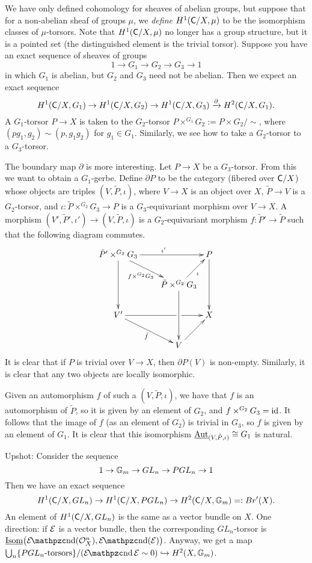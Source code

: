 \begin{remark}
 We have only defined cohomology for sheaves of abelian groups, but suppose that for a non-abelian sheaf of groups $\mu$, we \emph{define} $H^1(\text{\sf C}/X,\mu)$ to be the isomorphism classes of $\mu$-torsors. Note that $H^1(\text{\sf C}/X,\mu)$ no longer has a group structure, but it is a pointed set (the distinguished element is the trivial torsor). Suppose you have an exact sequence of sheaves of groups
 \[
  1\to G_1\to G_2\to G_3\to 1
 \]
 in which $G_1$ is abelian, but $G_2$ and $G_3$ need not be abelian. Then we expect an exact sequence
 \[
  H^1(\text{\sf C}/X,G_1)\to H^1(\text{\sf C}/X,G_2)\to H^1(\text{\sf C}/X,G_3)\xrightarrow\partial H^2(\text{\sf C}/X,G_1).
 \]
 A $G_1$-torsor $P\to X$ is taken to the $G_2$-torsor $P\times^{G_1}G_2:=P\times G_2/\sim$, where $(pg_1,g_2)\sim(p,g_1g_2)$ for $g_1\in G_1$. Similarly, we see how to take a $G_2$-torsor to a $G_3$-torsor.

 The boundary map $\partial$ is more interesting. Let $P\to X$ be a $G_3$-torsor. From this we want to obtain a $G_1$-gerbe. Define $\partial P$ to be the category (fibered over $\text{\sf C}/X$) whose objects are triples $(V,\tilde P,\iota)$, where $V\to X$ is an object over $X$, $\tilde P\to V$ is a $G_2$-torsor, and $\iota: \tilde P\times^{G_2}G_3\to P$ is a $G_3$-equivariant morphism over $V\to X$. A morphism $(V',\tilde P',\iota')\to (V,\tilde P,\iota)$ is a $G_2$-equivariant morphism $f:\tilde P' \to \tilde P$ such that the following diagram commutes.
 \[\xymatrix@!0 @R+1pc @C+1pc{
  \tilde P'\times^{G_2}G_3\ar[dd] \ar[drr]_{f\times^{G_2}G_3}\ar[rrr]^{\iota'} & & & P\ar[dd]\\
  & & \tilde P\times^{G_2}G_3 \ar[ur]_\iota \ar[dd]\\
  V'\ar[drr]_{\bar f} \ar[rrr]|(.6667)\hole & & & X\\
  & & V\ar[ur]
 }\]
  It is clear that if $P$ is trivial over $V\to X$, then $\partial P(V)$ is non-empty. Similarly, it is clear that any two objects are locally isomorphic.
 
 Given an automorphism $f$ of such a $(V,\tilde P,\iota)$, we have that $f$ is an automorphism of $\tilde P$, so it is given by an element of $G_2$, and $f\times^{G_2}G_3=\operatorname{id}$. It follows that the image of $f$ (as an element of $G_2$) is trivial in $G_3$, so $f$ is given by an element of $G_1$. It is clear that this isomorphism $\operatorname{\underline{Aut}}_{(V,\tilde P,\iota)}\cong G_1$ is natural.


 Upshot: Consider the sequence
 \[
  1\to \mathbb{G}_m\to GL_n\to PGL_n\to 1
 \]
 Then we have an exact sequence
 \[
  H^1(\text{\sf C}/X,GL_n)\to H^1(\text{\sf C}/X,PGL_n)\to H^2(\text{\sf C}/X,\mathbb{G}_m)=:Br'(X).
 \]
 An element of $H^1(\text{\sf C}/X,GL_n)$ is the same as a vector bundle on $X$. One direction: if $\mathcal{E}$ is a vector bundle, then the corresponding $GL_n$-torsor is $\isom\bigl(\End(\O_X^n),\End(\E)\bigr)$. Anyway, we get a map $\bigcup_n \{PGL_n\text{-torsors}\}/(\End \E\sim 0)\hookrightarrow H^2(X,\GG_m)$.
\end{remark}

